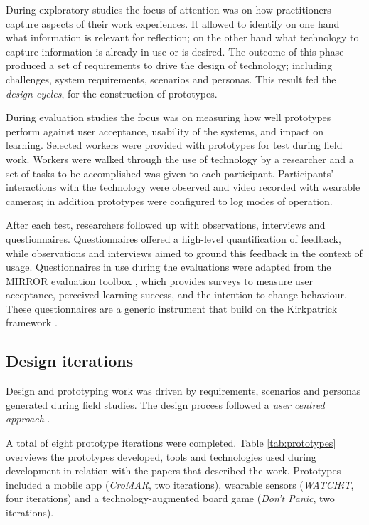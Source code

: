 During exploratory studies the focus of attention was on how practitioners capture aspects of their work experiences. It allowed to identify on one hand what information is relevant for reflection; on the other hand what technology to capture information is already in use or is desired. The outcome of this phase produced a set of requirements to drive the design of technology; including challenges, system requirements, scenarios and personas. This result fed the \emph{design cycles}, for the construction of prototypes.

During evaluation studies the focus was on measuring how well prototypes perform against user acceptance, usability of the systems, and impact on learning. Selected workers were provided with prototypes for test during field work. Workers were walked through the use of technology by a researcher and a set of tasks to be accomplished was given to each participant. Participants' interactions with the technology were observed and video recorded with wearable cameras; in addition prototypes were configured to log modes of operation.

After each test, researchers followed up with observations, interviews and questionnaires. Questionnaires offered a high-level quantification of feedback, while observations and interviews aimed to ground this feedback in the context of usage. Questionnaires in use during the evaluations were adapted from the MIRROR evaluation toolbox \autocite{Knipfer:2012vi}, which provides surveys to measure user acceptance, perceived learning success, and the intention to change behaviour. These questionnaires are a generic instrument that build on the Kirkpatrick framework \autocite{kirkpatrick2009evaluating}. 

\subsection{Design iterations}\label{prototypes}

Design and prototyping work was driven by requirements, scenarios and personas generated during field studies. The design process followed a \emph{user centred approach} \autocites{MAGUIRE:2001dp}{Gulliksen:2003hd}.

A total of eight prototype iterations were completed. Table \ref{tab:prototypes} overviews the prototypes developed, tools and technologies used during development in relation with the papers that described the work. Prototypes included a mobile app (\emph{CroMAR}, two iterations), wearable sensors (\emph{WATCHiT}, four iterations) and a technology-augmented board game (\emph{Don't Panic}, two iterations). 

